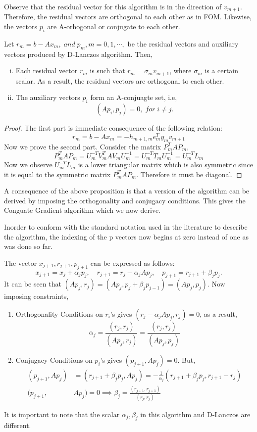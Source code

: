 \documentclass[10pt,a4paper]{article}
\begin{document}
Observe that the residual vector for this algorithm is in the direction of $v_{m+1}.$ Therefore, the residual vectors are orthogonal to each other as in FOM. Likewise, the vectors $p_i$ are A-orhogonal or conjugate to each other.

\begin{prop}
Let $r_m=b-Ax_m,\;and\;p_m,m=0,1,\cdots,$ be the residual vectors and auxiliary vectors produced by D-Lanczos algorithm. Then,
\begin{enumerate}[i)]
\item Each residual vector $r_m$ is such that $r_m=\sigma_{m}v_{m+1}$, where $\sigma_m$ is a certain scalar. As a result, the residual vectors are orthogonal to each other.
\item The auxiliary vectors $p_i$ form an A-conjuagte set, i.e,
$$(Ap_i,p_j)=0,\;for\;i\neq j.$$
\end{enumerate}
\end{prop}

\begin{proof}
The first part is immediate consequence of the following relation:
$$r_m=b-Ax_m=-h_{m+1,m}e^T_my_mv_{m+1}$$
Now we prove the second part. Consider the matrix $P^T_mAP_m$,
$$P^T_mAP_m = U^{-T}_mV^T_mAV_mU^{-1}_m = U^{-T}_mT_mU^{-1}_m = U^{-T}_mL_m$$
Now we observe $U^{-T}_mL_m$ is a lower triangular matrix which is also symmetric since it is equal to the symmetric matrix $P^T_mAP_m$. Therefore it must be diagonal.
\end{proof}

A consequence of the above proposition is that a version of the algorithm  can be derived by imposing the orthogonality and conjugacy conditions. This gives the Conguate Gradient algorithm which we now derive. 

\begin{remark}
Inorder to conform with the standard notation used in the literature to describe the algorithm, the indexing of the p vectors now begins at zero instead of one as was done so far.
\end{remark}

The vector $x_{j+1},r_{j+1},p_{j+1}$ can be expressed as follows:
$$x_{j+1}=x_j+\alpha_jp_j,\quad r_{j+1}=r_j-\alpha_jAp_j,\quad p_{j+1}=r_{j+1}+\beta_jp_j.$$
It can be seen that $(Ap_j,r_j)=(Ap_j,p_j+\beta_jp_{j-1})=(Ap_j,p_j).$ Now imposing constraints,
\begin{enumerate}
\item Orthogonality Conditions on $r_i$'s gives $(r_j-\alpha_jAp_j,r_j)=0$, as a result,
$$\alpha_j = \frac{(r_j,r_j)}{(Ap_j,r_j)}=\frac{(r_j,r_j)}{(Ap_j,p_j)}$$
\item Conjugacy Conditions on $p_i$'s gives $(p_{j+1},Ap_j)=0$. But,
\begin{align*}
(p_{j+1},Ap_j) &= (r_{j+1}+\beta_jp_j,Ap_j) = -\frac{1}{\alpha_j}(r_{j+1}+\beta_jp_j,r_{j+1}-r_j)\\ 
(p_{j+1},&Ap_j) = 0 \implies \beta_j=\frac{(r_{j+1},r_{j+1})}{(r_j,r_j)}
\end{align*}
\end{enumerate}
It is important to note that the scalar $\alpha_j,\beta_j$ in this algorithm and D-Lanczos are different.
\end{document}
